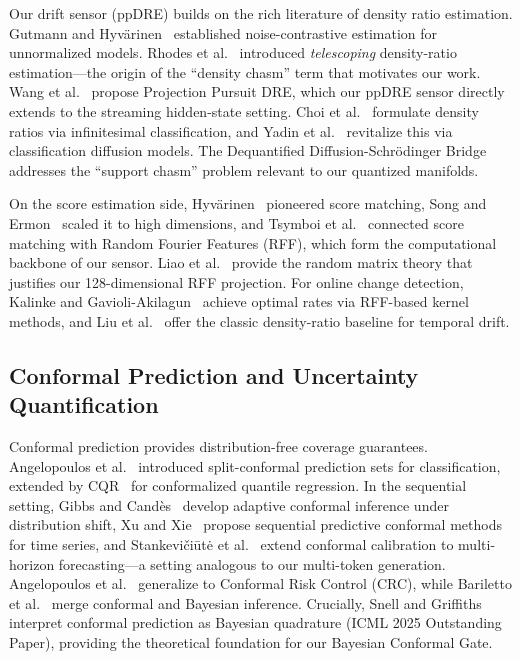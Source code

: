 \documentclass{uai2026}  %
\begin{document}
Our drift sensor (ppDRE) builds on the rich literature of density ratio estimation.
Gutmann and Hyv\"arinen~\cite{gutmann2012nce} established noise-contrastive estimation
for unnormalized models.
Rhodes et al.~\cite{rhodes2020telescoping} introduced \emph{telescoping} density-ratio estimation---the
origin of the ``density chasm'' term that motivates our work.
Wang et al.~\cite{wang2025ppdre} propose Projection Pursuit DRE, which
our ppDRE sensor directly extends to the streaming hidden-state setting.
Choi et al.~\cite{choi2022density} formulate density ratios via infinitesimal classification,
and Yadin et al.~\cite{yadin2024classification} revitalize this via classification diffusion models.
The Dequantified Diffusion-Schr\"odinger Bridge~\cite{dequantified2025bridge}
addresses the ``support chasm'' problem relevant to our quantized manifolds.

On the score estimation side,
Hyv\"arinen~\cite{hyvarinen2005score} pioneered score matching,
Song and Ermon~\cite{song2019generative} scaled it to high dimensions,
and Tsymboi et al.~\cite{tsymboi2022denoising} connected score matching with Random Fourier Features (RFF),
which form the computational backbone of our sensor.
Liao et al.~\cite{liao2020random} provide the random matrix theory that justifies our
128-dimensional RFF projection.
For online change detection,
Kalinke and Gavioli-Akilagun~\cite{kalinke2025optimal} achieve optimal rates via RFF-based
kernel methods, and
Liu et al.~\cite{liu2013changepoint} offer the classic density-ratio baseline for temporal drift.

\subsection{Conformal Prediction and Uncertainty Quantification}

Conformal prediction provides distribution-free coverage guarantees.
Angelopoulos et al.~\cite{angelopoulos2022conformal} introduced split-conformal
prediction sets for classification, extended by
CQR~\cite{romano2019cqr} for conformalized quantile regression.
In the sequential setting,
Gibbs and Cand\`es~\cite{gibbs2021adaptive} develop adaptive conformal inference
under distribution shift,
Xu and Xie~\cite{xu2023sequential} propose sequential predictive conformal methods for time series,
and Stankevi\v{c}i\=ut\.e et al.~\cite{stankeviciute2021conformal}
extend conformal calibration to multi-horizon forecasting---a
setting analogous to our multi-token generation.
Angelopoulos et al.~\cite{angelopoulos2024crc} generalize to Conformal Risk Control (CRC),
while Bariletto et al.~\cite{bariletto2025conformalized} merge conformal and Bayesian inference.
Crucially, Snell and Griffiths~\cite{snell2025conformal} interpret conformal prediction
as Bayesian quadrature (ICML 2025 Outstanding Paper), providing
the theoretical foundation for our Bayesian Conformal Gate.
\end{document}
